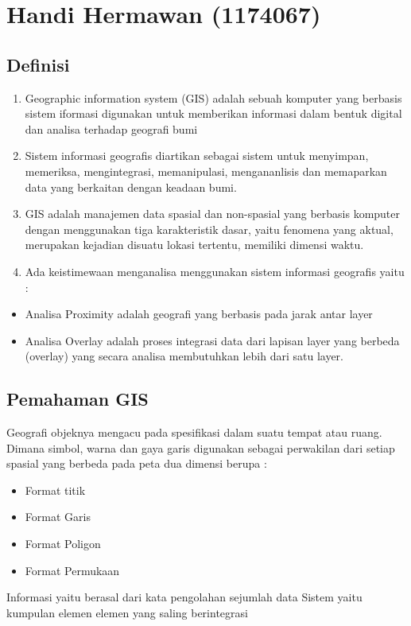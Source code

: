 \section{Handi Hermawan (1174067)}
\subsection{Definisi}
\begin{enumerate}
	\item Geographic information system (GIS) adalah sebuah komputer yang berbasis sistem iformasi digunakan untuk memberikan informasi dalam bentuk digital dan analisa terhadap geografi bumi
	\item Sistem informasi geografis diartikan sebagai sistem untuk menyimpan, memeriksa, mengintegrasi, memanipulasi, mengananlisis dan memaparkan data yang berkaitan dengan keadaan bumi.
	\item GIS adalah manajemen data spasial dan non-spasial yang berbasis komputer dengan menggunakan  tiga karakteristik dasar, yaitu fenomena yang aktual, merupakan kejadian disuatu lokasi tertentu, memiliki dimensi waktu.
	
	\item Ada keistimewaan menganalisa menggunakan sistem informasi geografis yaitu :
\end{enumerate}
	\begin{itemize}
	\item Analisa Proximity adalah geografi yang berbasis pada jarak antar layer
	\item Analisa Overlay adalah proses integrasi data dari lapisan layer yang berbeda (overlay) yang secara analisa membutuhkan lebih dari satu layer.
    \end{itemize}
    
\subsection{Pemahaman GIS}
Geografi objeknya mengacu pada spesifikasi dalam suatu tempat atau ruang. Dimana simbol, warna dan gaya garis digunakan sebagai perwakilan dari setiap spasial yang berbeda pada peta dua dimensi berupa :
    \begin{itemize}
	\item Format titik
	\item Format Garis 
	\item Format Poligon 
	\item Format Permukaan
    \end{itemize}
Informasi yaitu berasal dari kata pengolahan sejumlah data 
Sistem yaitu kumpulan elemen elemen yang saling berintegrasi 
    
